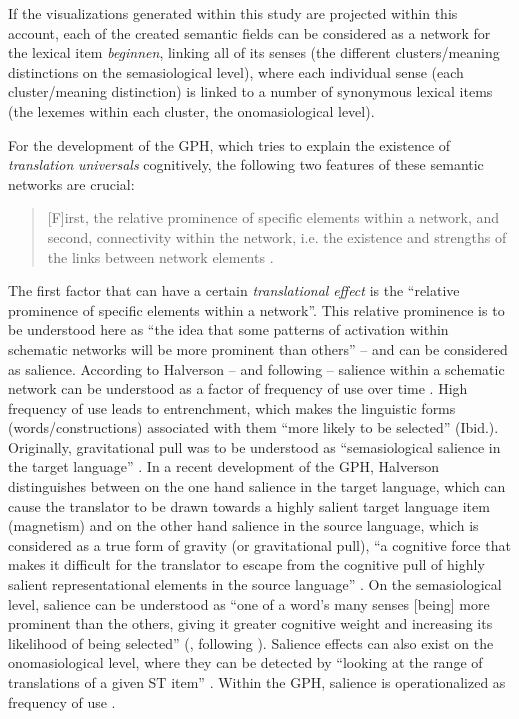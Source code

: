 If the visualizations generated within this study are projected within this account, each of the created semantic fields can be considered as a network for the lexical item \textit{beginnen}, linking all of its senses (the different clusters/meaning distinctions on the semasiological level), where each individual sense (each cluster/meaning distinction) is linked to a number of synonymous lexical items (the lexemes within each cluster, the onomasiological level).

For the development of the GPH, which tries to explain the existence of \textit{translation} \textit{universals} cognitively, the following two features of these semantic networks are crucial:

\begin{quote}
[F]irst, the relative prominence of specific elements within a network, and second, connectivity within the network, i.e. the existence and strengths of the links between network elements \citep[12]{de_sutter_developing_2017}.
\end{quote}

The first factor that can have a certain \textit{translational} \textit{effect} is the “relative prominence of specific elements within a network”. This relative prominence is to be understood here as “the idea that some patterns of activation within schematic networks will be more prominent than others” \citep[13]{de_sutter_developing_2017} – and can be considered as salience. According to Halverson – and following \citet[226]{langacker_cognitive_2008} – salience within a schematic network can be understood as a factor of frequency of use over time \citep[13]{de_sutter_developing_2017}. High frequency of use leads to entrenchment, which makes the linguistic forms (words/constructions) associated with them “more likely to be selected” (Ibid.). Originally, gravitational pull \citep{halverson_cognitive_2003} was to be understood as “semasiological salience in the target language” \citep[14]{de_sutter_developing_2017}. In a recent development of the GPH, Halverson distinguishes between on the one hand salience in the target language, which can cause the translator to be drawn towards a highly salient target language item (magnetism) and on the other hand salience in the source language, which is considered as a true form of gravity (or gravitational pull), “a cognitive force that makes it difficult for the translator to escape from the cognitive pull of highly salient representational elements in the source language” \citep[14]{de_sutter_developing_2017}. On the semasiological level, salience can be understood as “one of a word’s many senses [being] more prominent than the others, giving it greater cognitive weight and increasing its likelihood of being selected” (\citealt[13]{de_sutter_developing_2017}, following \citealt[80]{geeraerts_words_2009}). Salience effects can also exist on the onomasiological level, where they can be detected by “looking at the range of translations of a given ST item” \citep[28]{de_sutter_developing_2017}. Within the GPH, salience is operationalized as frequency of use \citep[13]{de_sutter_developing_2017}.

